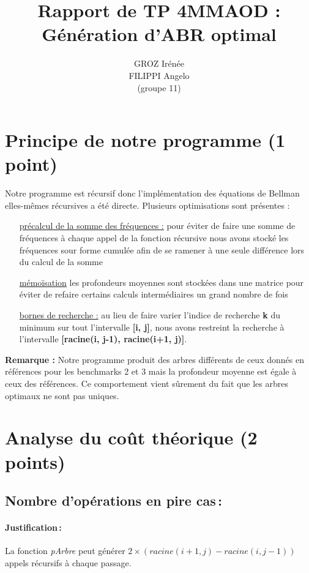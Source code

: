 \documentclass[a4paper, 10pt, french]{article}
\title{Rapport de TP 4MMAOD : Génération d'ABR optimal}
\author{
GROZ Irénée 
\\FILIPPI Angelo 
\\(groupe 11) 
}
\begin{document}
\maketitle


\section{Principe de notre  programme (1 point)}
Notre programme est récursif donc l'implémentation des équations de Bellman elles-mêmes récursives a été directe.
Plusieurs optimisations sont présentes :

\begin{itemize}
\item[\underline{précalcul de la somme des fréquences :}] pour éviter de faire une somme de fréquences à chaque appel de la fonction récursive nous avons stocké les fréquences sour forme cumulée afin de se ramener à une seule différence lors du calcul de la somme
\item[\underline{mémoïsation}] les profondeurs moyennes sont stockées dans une matrice pour éviter de refaire certains calculs intermédiaires un grand nombre de fois
\item[\underline{bornes de recherche :}] au lieu de faire varier l'indice de recherche \textbf{k} du minimum sur tout l'intervalle \textbf{[i, j]}, nous avons restreint la recherche à l'intervalle \textbf{[racine(i, j-1), racine(i+1, j)]}.
\end{itemize}


\textbf{Remarque :} Notre programme produit des arbres différents de ceux donnés en références pour les benchmarks 2 et 3 mais la profondeur moyenne est égale à ceux des références. Ce comportement vient sûrement du fait que les arbres optimaux ne sont pas uniques.

\section{Analyse du coût théorique (2 points)}

  \subsection{Nombre  d'opérations en pire cas\,: }
    \paragraph{Justification\,: } La fonction \emph{pArbre} peut générer \textbf{$2 \times (racine(i+1, j) - racine(i, j-1))$} appels récursifs à chaque passage.
    
\end{document}
